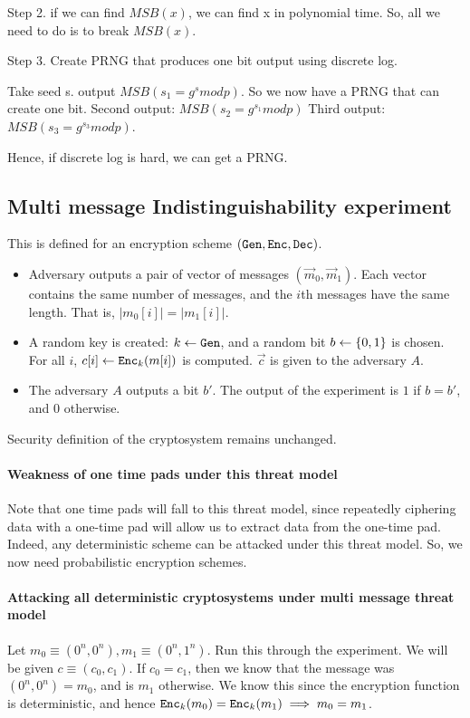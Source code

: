 Step 2. if we can find $MSB(x)$, we can find x in polynomial time. So, all we need to do is to break $MSB(x)$.


Step 3. Create PRNG that produces one bit output using discrete log.

Take seed s. output $MSB(s_1 = g^s mod p)$. So we now have a PRNG that can create one bit. Second output: $MSB(s_2 = g^{s_1} mod p )$
Third output: $MSB(s_3 = g^{s_3} mod p)$.

Hence, if discrete log is hard, we can get a PRNG. 

\subsection{Multi message Indistinguishability experiment}

This is defined for an encryption scheme $(\texttt{Gen}, \texttt{Enc}, \texttt{Dec})$.
\begin{itemize}
\item Adversary outputs a pair of vector of messages $(\vec m_0, \vec m_1)$. Each
    vector contains the same number of messages, and the $i$th messages have the
    same length. That is, $|m_0[i]| = |m_1[i]|$.
\item A random key is created: $ k \leftarrow \texttt{Gen}$, and a random bit
    $b \leftarrow \{0, 1\}$ is chosen. For all $i$, $c[i] \leftarrow \texttt{Enc}_k(m[i])$
    is computed. $\vec c$ is given to the adversary $A$.
\item The adversary $A$ outputs a bit $b'$. The output of the experiment is $1$
    if $b = b'$, and $0$ otherwise.
\end{itemize}

Security definition of the cryptosystem remains unchanged.


\paragraph{Weakness of one time pads under this threat model}
Note that one time pads will fall to this threat model, since repeatedly
ciphering data with a one-time pad will allow us to extract data from the
one-time pad. Indeed, any deterministic scheme can be attacked under
this threat model. So, we now need probabilistic encryption schemes.

\paragraph{Attacking all deterministic cryptosystems under multi message threat model}
Let $m_0 \equiv (0^n, 0^n), m_1 \equiv (0^n, 1^n)$. Run this through the experiment. We will
be given $c \equiv (c_0, c_1)$. If $c_0 = c_1$, then  we know that the message
was $(0^n, 0^n) = m_0$, and is $m_1$ otherwise. We know this since the encryption
function is deterministic, and  hence $\texttt{Enc}_k(m_0) = \texttt{Enc}_k(m_1) \implies m_0 = m_1$.

